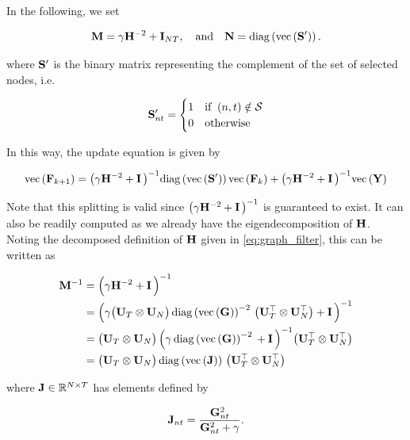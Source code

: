 In the following, we set 

\begin{equation}
    \mathbf{M} = \gamma \mathbf{H}^{-2} + \mathbf{I}_{NT}, \quad \text{and} \quad \mathbf{N} = \text{\textup{diag}}\left(\text{\textup{vec}}\left(\mathbf{S}'\right)\right).
\end{equation}

where $\mathbf{S}'$ is the binary matrix representing the complement of the set of selected nodes, i.e.

\begin{equation}
    \label{eq:S_}
    \mathbf{S}'_{nt} = \begin{cases}
        1 & \text{if} \;\; (n, t) \notin \mathcal{S} \\
        0 & \text{otherwise}
    \end{cases}
\end{equation}

In this way, the update equation is given by 

\begin{equation}
    \label{eq:sim_update2}
    \text{\textup{vec}}\left(\mathbf{F}_{k+1}\right) = \big(\gamma \mathbf{H}^{-2} + \mathbf{I} \, \big)^{-1}  \text{\textup{diag}}\left(\text{\textup{vec}}\left(\mathbf{S}'\right)\right) \text{\textup{vec}}\left(\mathbf{F}_{k}\right) + \big(\gamma \mathbf{H}^{-2} + \mathbf{I} \, \big)^{-1} \text{\textup{vec}}\left(\mathbf{Y}\right)
\end{equation}



Note that this splitting is valid since $\big(\gamma\mathbf{H}^{-2} + \mathbf{I} \, \big)^{-1}$ is guaranteed to exist. It can also be readily computed as we already have the eigendecomposition of $\mathbf{H}$. Noting the decomposed definition of $\mathbf{H}$ given in \cref{eq:graph_filter}, this can be written as

\begin{align}
    \label{eq:M_inv}
    \mathbf{M}^{-1} & = \Big( \gamma \mathbf{H}^{-2} + \mathbf{I} \, \Big)^{-1} \notag \\
            & = \Big( \gamma \big(\mathbf{U}_T \otimes \mathbf{U}_N\big)\, \text{\textup{diag}}\left(\text{\textup{vec}}\left(\mathbf{G}\right)\right)^{-2}\,  \big(\mathbf{U}_T^\top \otimes \mathbf{U}_N^\top\big)  + \mathbf{I} \, \Big)^{-1} \notag   \\
            & = \big(\mathbf{U}_T \otimes \mathbf{U}_N\big)\, \Big( \gamma \, \text{\textup{diag}}\left(\text{\textup{vec}}\left(\mathbf{G}\right)\right)^{-2}\,    + \mathbf{I} \, \Big)^{-1} \big(\mathbf{U}_T^\top \otimes \mathbf{U}_N^\top\big) \notag \\
            & = \big(\mathbf{U}_T \otimes \mathbf{U}_N\big)\, \text{\textup{diag}}\left(\text{\textup{vec}}\left(\mathbf{J}\right)\right)\,  \big(\mathbf{U}_T^\top \otimes \mathbf{U}_N^\top\big)
\end{align}

\noindent where $\mathbf{J} \in \mathbb{R}^{N \times T}$ has elements defined by

\begin{equation}
    \label{eq:Jnt}
    \mathbf{J}_{nt} = \frac{\mathbf{G}_{nt}^2}{\mathbf{G}_{nt}^2 + \gamma}.
\end{equation}

